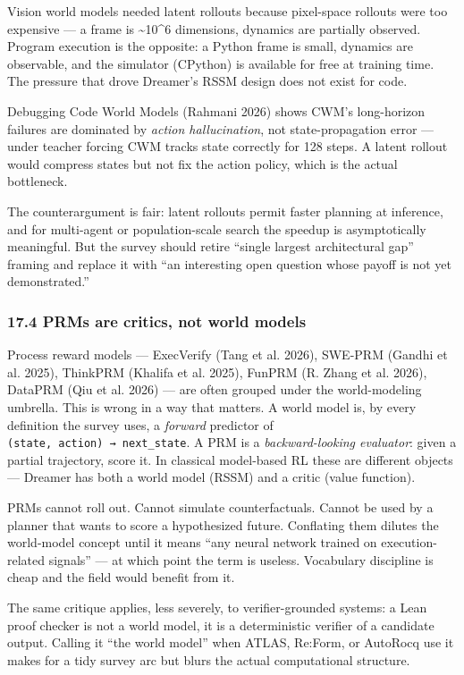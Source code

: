 \documentclass{article}
\begin{document}
Vision world models needed latent rollouts because pixel-space rollouts
were too expensive --- a frame is \textasciitilde10\^{}6 dimensions,
dynamics are partially observed. Program execution is the opposite: a
Python frame is small, dynamics are observable, and the simulator
(CPython) is available for free at training time. The pressure that
drove Dreamer's RSSM design does not exist for code.

Debugging Code World Models (Rahmani 2026) shows CWM's long-horizon
failures are dominated by \emph{action hallucination}, not
state-propagation error --- under teacher forcing CWM tracks state
correctly for 128 steps. A latent rollout would compress states but not
fix the action policy, which is the actual bottleneck.

The counterargument is fair: latent rollouts permit faster planning at
inference, and for multi-agent or population-scale search the speedup is
asymptotically meaningful. But the survey should retire ``single largest
architectural gap'' framing and replace it with ``an interesting open
question whose payoff is not yet demonstrated.''

\hypertarget{prms-are-critics-not-world-models}{%
\subsubsection{17.4 PRMs are critics, not world
models}\label{prms-are-critics-not-world-models}}

Process reward models --- ExecVerify (Tang et al. 2026), SWE-PRM (Gandhi
et al. 2025), ThinkPRM (Khalifa et al. 2025), FunPRM (R. Zhang et al.
2026), DataPRM (Qiu et al. 2026) --- are often grouped under the
world-modeling umbrella. This is wrong in a way that matters. A world
model is, by every definition the survey uses, a \emph{forward}
predictor of \texttt{(state,\ action)\ →\ next\_state}. A PRM is a
\emph{backward-looking evaluator}: given a partial trajectory, score it.
In classical model-based RL these are different objects --- Dreamer has
both a world model (RSSM) and a critic (value function).

PRMs cannot roll out. Cannot simulate counterfactuals. Cannot be used by
a planner that wants to score a hypothesized future. Conflating them
dilutes the world-model concept until it means ``any neural network
trained on execution-related signals'' --- at which point the term is
useless. Vocabulary discipline is cheap and the field would benefit from
it.

The same critique applies, less severely, to verifier-grounded systems:
a Lean proof checker is not a world model, it is a deterministic
verifier of a candidate output. Calling it ``the world model'' when
ATLAS, Re:Form, or AutoRocq use it makes for a tidy survey arc but blurs
the actual computational structure.
\end{document}
